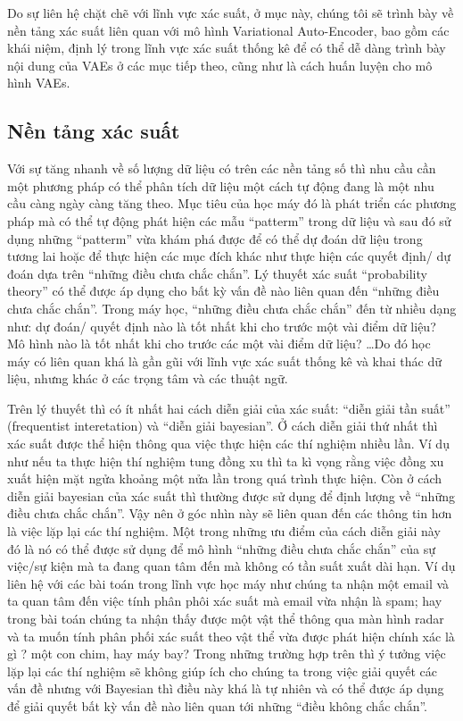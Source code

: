         Do sự liên hệ chặt chẽ với lĩnh vực xác suất, ở mục này, chúng tôi sẽ trình bày về nền tảng xác suất liên quan với mô hình Variational Auto-Encoder, bao gồm các khái niệm, định lý trong lĩnh vực xác suất thống kê để có thể dễ dàng trình bày nội dung của VAEs ở các mục tiếp theo, cũng như là cách huấn luyện cho mô hình VAEs. 
        

    \subsection{Nền tảng xác suất} \label{chap2/subsec21}
        
        Với sự tăng nhanh về số lượng dữ liệu có trên các nền tảng số thì nhu cầu cần một phương pháp có thể phân tích dữ liệu một cách tự động đang là một nhu cầu càng ngày càng tăng theo. Mục tiêu của học máy đó là phát triển các phương pháp mà có thể tự động phát hiện các mẫu ``patterm'' trong dữ liệu và sau đó sử dụng những ``patterm'' vừa khám phá được để có thể dự đoán dữ liệu trong tương lai hoặc để thực hiện các mục đích khác như thực hiện các quyết định/ dự đoán dựa trên ``những điều chưa chắc chắn''. Lý thuyết xác suất ``probability theory'' có thể được áp dụng cho bất kỳ vấn đề nào liên quan đến ``những điều chưa chắc chắn''. Trong máy học, ``những điều chưa chắc chắn'' đến từ nhiều dạng như: dự đoán/ quyết định nào là tốt nhất khi cho trước một vài điểm dữ liệu? Mô hình nào là tốt nhất khi cho trước các một vài điểm dữ liệu? \dots Do đó học máy có liên quan khá là gần gũi với lĩnh vực xác suất thống kê và khai thác dữ liệu, nhưng khác ở các trọng tâm và các thuật ngữ. 
        
        Trên lý thuyết thì có ít nhất hai cách diễn giải của xác suất:  ``diễn giải tần suất'' (frequentist interetation) và ``diễn giải bayesian''. Ở cách diễn giải thứ nhất thì xác suất được thể hiện thông qua việc thực hiện các thí nghiệm nhiều lần. Ví dụ như nếu ta thực hiện thí nghiệm tung đồng xu thì ta kì vọng rằng việc đồng xu xuất hiện mặt ngửa khoảng một nửa lần trong quá trình thực hiện. Còn ở cách diễn giải bayesian của xác suất thì thường được sử dụng để định lượng về ``những điều chưa chắc chắn''. Vậy nên ở góc nhìn này sẽ liên quan đến các thông tin hơn là việc lặp lại các thí nghiệm. Một trong những ưu điểm của cách diễn giải này đó là nó có thể được sử dụng để mô hình ``những điều chưa chắc chắn'' của sự việc/sự kiện mà ta đang quan tâm đến mà không có tần suất xuất dài hạn. Ví dụ liên hệ với các bài toán trong lĩnh vực học máy như chúng ta nhận một email và ta quan tâm đến việc tính phân phôi xác suất mà email vừa nhận là spam; hay trong bài toán chúng ta nhận thấy được một vật thể thông qua màn hình radar và ta muốn tính phân phối xác suất theo vật thể vừa được phát hiện chính xác là gì ? một con chim, hay máy bay? Trong những trường hợp trên thì ý tưởng việc lặp lại các thí nghiệm sẽ không giúp ích cho chúng ta trong việc giải quyết các vấn đề nhưng với Bayesian thì điều này khá là tự nhiên và có thể được áp dụng để giải quyết bất kỳ vấn đề nào liên quan tới những ``điều không chắc chắn''.
        
